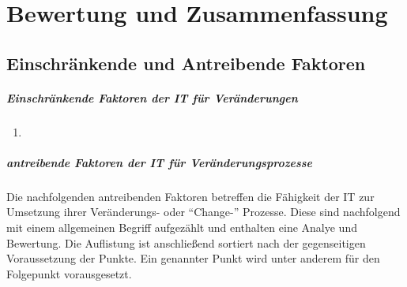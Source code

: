 \chapter{Bewertung und Zusammenfassung}
\label{chapter:evaluation}

\section{Einschränkende und Antreibende Faktoren}
\label{section:faktoren-change}

\paragraph{Einschränkende Faktoren der IT für Veränderungen}
\begin{enumerate}
    \item 
\end{enumerate}

\paragraph{antreibende Faktoren der IT für Veränderungsprozesse}
Die nachfolgenden antreibenden Faktoren betreffen die Fähigkeit der IT zur Umsetzung ihrer Veränderungs- oder \enquote{Change-} Prozesse. Diese sind nachfolgend mit einem allgemeinen Begriff aufgezählt und enthalten eine Analye und Bewertung. Die Auflistung ist anschließend sortiert nach der gegenseitigen Voraussetzung der Punkte. Ein genannter Punkt wird unter anderem für den Folgepunkt vorausgesetzt.

